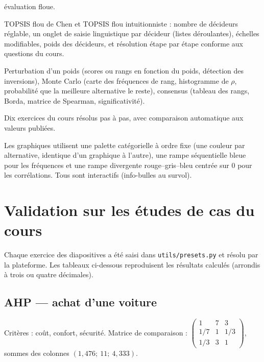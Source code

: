 \documentclass[11pt,a4paper]{report}
\theoremstyle{definition}
\theoremstyle{remark}
\begin{document}
\begin{description}
        évaluation floue.
  \item[4 · MCDM floue] TOPSIS flou de Chen et TOPSIS flou intuitionniste : nombre de décideurs réglable, un
        onglet de saisie linguistique par décideur (listes déroulantes), échelles modifiables, poids des
        décideurs, et résolution étape par étape conforme aux questions du cours.
  \item[5 · Sensibilité \& consensus] Perturbation d'un poids (scores ou rangs en fonction du poids,
        détection des inversions), Monte Carlo (carte des fréquences de rang, histogramme de $\rho$,
        probabilité que la meilleure alternative le reste), consensus (tableau des rangs, Borda, matrice de
        Spearman, significativité).
  \item[6 · Études de cas] Dix exercices du cours résolus pas à pas, avec comparaison automatique aux
        valeurs publiées.
\end{description}

Les graphiques utilisent une palette catégorielle à ordre fixe (une couleur par alternative, identique
d'un graphique à l'autre), une rampe séquentielle bleue pour les fréquences et une rampe divergente
rouge--gris--bleu centrée sur 0 pour les corrélations. Tous sont interactifs (info-bulles au survol).

\chapter{Validation sur les études de cas du cours}\label{ch:validation}

Chaque exercice des diapositives a été saisi dans \texttt{utils/presets.py} et résolu par la plateforme.
Les tableaux ci-dessous reproduisent les résultats calculés (arrondis à trois ou quatre décimales).

\section{AHP --- achat d'une voiture}

Critères : coût, confort, sécurité. Matrice de comparaison :
$\begin{pmatrix}1&7&3\\1/7&1&1/3\\1/3&3&1\end{pmatrix}$, sommes des colonnes $(1{,}476;\ 11;\ 4{,}333)$.
\end{document}
